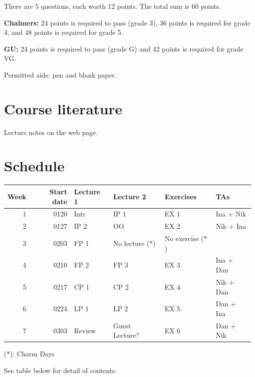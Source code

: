 \documentclass[oneside,11pt]{article}
\begin{document}
There are 5 questions, each worth 12 points. The total sum is 60
points.

\textbf{Chalmers:}
24 points is required to pass (grade 3), 36 points is required for
grade 4, and 48 points is required for grade 5.

\textbf{GU:}
24 points is required to pass (grade G) and 42 points is
required for grade VG.

Permitted aids: pen and blank paper.

\section*{Course literature}
Lecture notes on the web page.
\section*{Schedule}

\begin{center}
\begin{tabular}{rrllll}
Week & Start date & Lecture 1 & Lecture 2 & Exercises & TAs\\
\hline
1 & 0120 & Intr & IP 1 & EX 1 & Ina + Nik\\
2 & 0127 & IP 2 & OO & EX 2 & Nik + Ina\\
3 & 0203 & FP 1 & No lecture ($\ast$) & No exercise ($\ast$) & \\
4 & 0210 & FP 2 & FP 3 & EX 3 & Ina + Dan\\
5 & 0217 & CP 1 & CP 2 & EX 4 & Nik + Dan\\
6 & 0224 & LP 1 & LP 2 & EX 5 & Dan + Ina\\
7 & 0303 & Review & Guest Lecture? & EX 6 & Dan + Nik\\
\end{tabular}
\end{center}

($\ast$): Charm Days

See table below for detail of contents.
\end{document}
